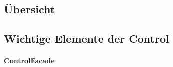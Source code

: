 \documentclass[parskip=full]{scrartcl}
\begin{document}
\subsection{Übersicht}
\subsection{Wichtige Elemente der Control}
\paragraph{ControlFacade}
\end{document}

